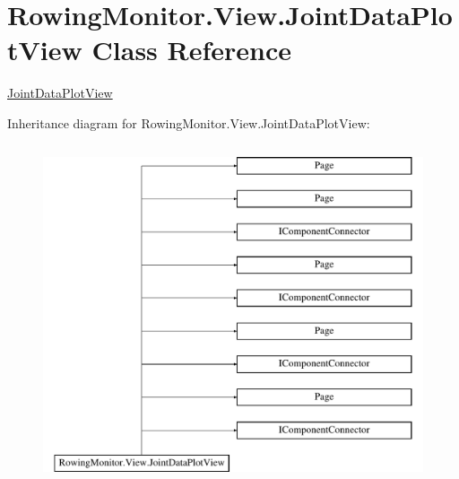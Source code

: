 \hypertarget{class_rowing_monitor_1_1_view_1_1_joint_data_plot_view}{}\section{Rowing\+Monitor.\+View.\+Joint\+Data\+Plot\+View Class Reference}
\label{class_rowing_monitor_1_1_view_1_1_joint_data_plot_view}


\hyperlink{class_rowing_monitor_1_1_view_1_1_joint_data_plot_view}{Joint\+Data\+Plot\+View}  


Inheritance diagram for Rowing\+Monitor.\+View.\+Joint\+Data\+Plot\+View\+:\begin{figure}[H]
\begin{center}
\leavevmode
\includegraphics[height=10.000000cm]{class_rowing_monitor_1_1_view_1_1_joint_data_plot_view}
\end{center}
\end{figure}
